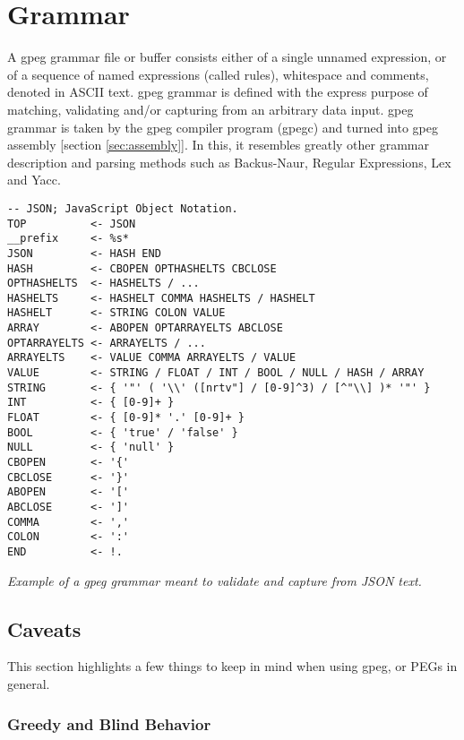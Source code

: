 \section{Grammar}
\label{sec:grammar}

A gpeg grammar file or buffer consists either of a single
unnamed expression, or of a sequence of named expressions (called rules),
whitespace and comments, denoted in ASCII text.
gpeg grammar is defined with the express purpose of matching, validating
and/or capturing from an arbitrary data input.
gpeg grammar is taken by the gpeg compiler program (gpegc) and turned
into gpeg assembly [section \ref{sec:assembly}].
In this, it resembles greatly other grammar description and parsing methods
such as Backus-Naur, Regular Expressions, Lex and Yacc.

\begin{myquote}
\begin{verbatim}
-- JSON; JavaScript Object Notation.
TOP          <- JSON
__prefix     <- %s*
JSON         <- HASH END
HASH         <- CBOPEN OPTHASHELTS CBCLOSE
OPTHASHELTS  <- HASHELTS / ...
HASHELTS     <- HASHELT COMMA HASHELTS / HASHELT
HASHELT      <- STRING COLON VALUE
ARRAY        <- ABOPEN OPTARRAYELTS ABCLOSE
OPTARRAYELTS <- ARRAYELTS / ...
ARRAYELTS    <- VALUE COMMA ARRAYELTS / VALUE
VALUE        <- STRING / FLOAT / INT / BOOL / NULL / HASH / ARRAY
STRING       <- { '"' ( '\\' ([nrtv"] / [0-9]^3) / [^"\\] )* '"' }
INT          <- { [0-9]+ }
FLOAT        <- { [0-9]* '.' [0-9]+ }
BOOL         <- { 'true' / 'false' }
NULL         <- { 'null' }
CBOPEN       <- '{'
CBCLOSE      <- '}'
ABOPEN       <- '['
ABCLOSE      <- ']'
COMMA        <- ','
COLON        <- ':'
END          <- !.
\end{verbatim}
\end{myquote}
\textit{Example of a gpeg grammar meant to validate and capture from
JSON\cite{bib:json} text.}

\subsection{Caveats}

This section highlights a few things to keep in mind when using
gpeg, or PEGs in general.

\subsubsection{Greedy and Blind Behavior}

